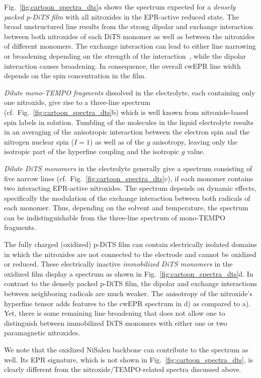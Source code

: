 Fig.~\ref{fig:cartoon_spectra_dts}a shows the spectrum expected for a \emph{densely packed p-DiTS film} with all nitroxides in the EPR-active reduced state. The broad unstructured line results from the strong dipolar and exchange interaction between both nitroxides of each DiTS monomer as well as between the nitroxides of different monomers. The exchange interaction can lead to either line narrowing or broadening depending on the strength of the interaction~\cite{Anderson1953}, while the dipolar interaction causes broadening. In consequence, the overall cwEPR line width depends on the spin concentration in the film.
\par 
\emph{Dilute mono-TEMPO fragments} dissolved in the electrolyte, each containing only one nitroxide, give rise to a three-line spectrum (cf.\ Fig.~\ref{fig:cartoon_spectra_dts}b) which is well known from nitroxide-based spin labels in solution.\cite{Liu_2008} Tumbling of the molecules in the liquid electrolyte results in an averaging of the anisotropic interaction between the electron spin and the nitrogen nuclear spin ($I = 1$) as well as of the $g$ anisotropy, leaving only the isotropic part of the hyperfine coupling and the isotropic $g$ value. 
\par
\emph{Dilute DiTS monomers} in the electrolyte generally give a spectrum consisting of five narrow lines (cf.\ Fig.~\ref{fig:cartoon_spectra_dts}c), if each monomer contains two interacting EPR-active nitroxides. The spectrum depends on dynamic effects, specifically the modulation of the exchange interaction between both radicals of each monomer.  Thus, depending on the solvent and temperature, the spectrum can be indistinguishable from the three-line spectrum of mono-TEMPO fragments.
\par
The fully charged (oxidized) p-DiTS film can contain electrically isolated domains in which the nitroxides are not connected to the electrode and cannot be oxidized or reduced. These electrically inactive \emph{immobilized DiTS monomers} in the oxidized film display a spectrum as shown in Fig.~\ref{fig:cartoon_spectra_dts}d. In contrast to the densely packed p-DiTS film, the dipolar and exchange interactions between neighboring radicals are much weaker. The anisotropy of the nitroxide's hyperfine tensor adds features to the cwEPR spectrum in d) as compared to a).
Yet, there is some remaining line broadening that does not allow one to distinguish between immobilized DiTS monomers with either one or two paramagnetic nitroxides.
\par
We note that the oxidized NiSalen backbone can contribute to the spectrum as well. Its EPR signature, which is not shown in Fig.~\ref{fig:cartoon_spectra_dts}, is clearly different from the nitroxide/TEMPO-related spectra discussed above.
%


